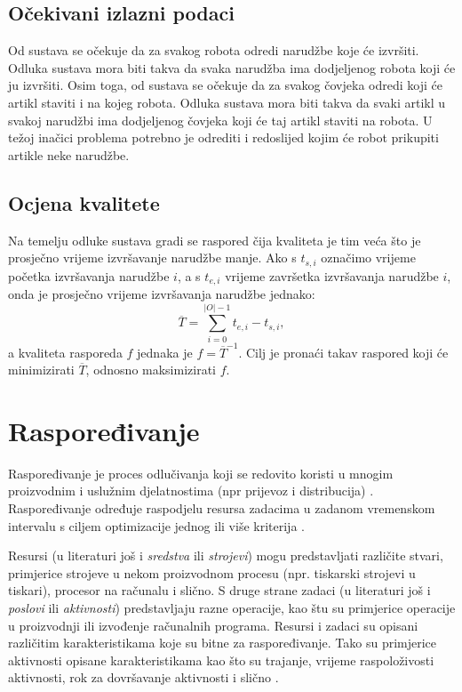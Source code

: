 \documentclass[times, utf8, seminar]{fer}
\begin{document}
\section{Očekivani izlazni podaci}
Od sustava se očekuje da za svakog robota odredi narudžbe koje će izvršiti. Odluka sustava mora biti
takva da svaka narudžba ima dodjeljenog robota koji će ju izvršiti. Osim toga, od sustava se očekuje
da za svakog čovjeka odredi koji će artikl staviti i na kojeg robota. Odluka sustava mora biti
takva da svaki artikl u svakoj narudžbi ima dodjeljenog čovjeka koji će taj artikl staviti na robota.
U težoj inačici problema potrebno je odrediti i redoslijed kojim
će robot prikupiti artikle neke narudžbe.

\section{Ocjena kvalitete}
Na temelju odluke sustava gradi se raspored čija kvaliteta  je tim
veća što je prosječno vrijeme izvršavanje narudžbe manje. Ako s
$t_{s, i}$ označimo vrijeme početka izvršavanja narudžbe $i$, a s $t_{e, i}$
vrijeme završetka izvršavanja narudžbe $i$, onda je prosječno vrijeme izvršavanja
narudžbe jednako:
\begin{equation}
    \overline{T} = \sum_{i = 0}^{|O| - 1}{t_{e, i} - t_{s, i}},
\end{equation}
a kvaliteta rasporeda $f$ jednaka je $f = \overline{T}^{-1}$. Cilj je
pronaći takav raspored koji će minimizirati $\overline{T}$, odnosno
maksimizirati $f$.

\chapter{Raspoređivanje}
Raspoređivanje je proces odlučivanja koji se redovito koristi u
mnogim proizvodnim i uslužnim djelatnostima (npr prijevoz i distribucija) \citep{michael2018scheduling}.
Raspoređivanje određuje raspodjelu resursa zadacima u zadanom vremenskom
intervalu s ciljem optimizacije jednog ili više kriterija \citep{michael2018scheduling}.

Resursi (u literaturi još i \emph{sredstva} ili \emph{strojevi}) mogu predstavljati različite stvari, primjerice strojeve
u nekom proizvodnom procesu (npr. tiskarski strojevi u tiskari), procesor na računalu
i slično. S druge strane zadaci (u literaturi još i \emph{poslovi} ili \emph{aktivnosti}) predstavljaju
razne operacije, kao štu su primjerice operacije u proizvodnji ili izvođenje računalnih programa.
Resursi i zadaci su opisani različitim karakteristikama koje su bitne za raspoređivanje.
Tako su primjerice aktivnosti opisane karakteristikama kao što su trajanje, vrijeme raspoloživosti
aktivnosti, rok za dovršavanje aktivnosti i slično \citep{Durasevic}.
\end{document}
